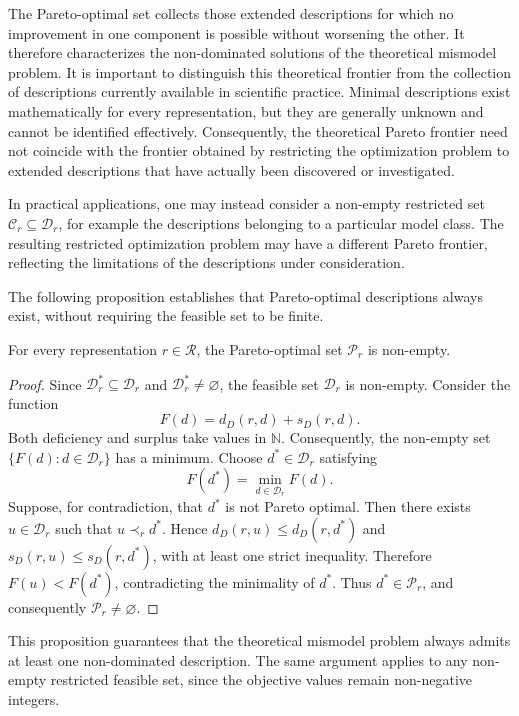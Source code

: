 The Pareto-optimal set collects those extended descriptions for which no improvement in one component is possible without worsening the other. It therefore characterizes the non-dominated solutions of the theoretical mismodel problem. It is important to distinguish this theoretical frontier from the collection of descriptions currently available in scientific practice. Minimal descriptions exist mathematically for every representation, but they are generally unknown and cannot be identified effectively. Consequently, the theoretical Pareto frontier need not coincide with the frontier obtained by restricting the optimization problem to extended descriptions that have actually been discovered or investigated.


In practical applications, one may instead consider a non-empty restricted set $\mathcal C_r\subseteq\mathcal D_r$, for example the descriptions belonging to a particular model class. The resulting restricted optimization problem may have a different Pareto frontier, reflecting the limitations of the descriptions under consideration.

The following proposition establishes that Pareto-optimal descriptions always exist, without requiring the feasible set to be finite.

\begin{proposition}
\label{prop:pareto_nonempty_descriptions}
For every representation $r\in\mathcal R$, the Pareto-optimal set $\mathcal P_r$ is non-empty.
\end{proposition}
\begin{proof}
Since $\mathcal D_r^\ast\subseteq\mathcal D_r$ and $\mathcal D_r^\ast\neq\varnothing$, the feasible set $\mathcal D_r$ is non-empty. Consider the function
\[
F(d)=d_D(r,d)+s_D(r,d).
\]
Both deficiency and surplus take values in $\mathbb N$. Consequently, the non-empty set $\{F(d):d\in\mathcal D_r\}$ has a minimum. Choose $d^\ast\in\mathcal D_r$ satisfying
\[
F(d^\ast)=\min_{d\in\mathcal D_r}F(d).
\]
Suppose, for contradiction, that $d^\ast$ is not Pareto optimal. Then there exists $u\in\mathcal D_r$ such that
$u\prec_r d^\ast$. Hence $d_D(r,u)\le d_D(r,d^\ast)$ and $s_D(r,u)\le s_D(r,d^\ast)$, with at least one strict inequality. Therefore $F(u)<F(d^\ast)$, contradicting the minimality of $d^\ast$. Thus $d^\ast\in\mathcal P_r$, and consequently $\mathcal P_r\neq\varnothing$.
\end{proof}

This proposition guarantees that the theoretical mismodel problem always admits at least one non-dominated description. The same argument applies to any non-empty restricted feasible set, since the objective values remain non-negative integers.

